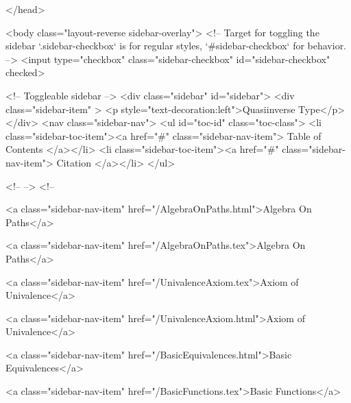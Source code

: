   
</head>




  <body class="layout-reverse sidebar-overlay">
    <!-- Target for toggling the sidebar `.sidebar-checkbox` is for regular
     styles, `#sidebar-checkbox` for behavior. -->
<input type="checkbox" class="sidebar-checkbox" id="sidebar-checkbox" checked>

<!-- Toggleable sidebar -->
<div class="sidebar" id="sidebar">
  <div class="sidebar-item" >
    <p style="text-decoration:left">Quasiinverse Type</p>
  </div>
  <nav class="sidebar-nav">
    <ul id="toc-id" class="toc-class">
  <li class="sidebar-toc-item"><a href="#" class="sidebar-nav-item"> Table of Contents </a></li>
  <li class="sidebar-toc-item"><a href="#" class="sidebar-nav-item"> Citation </a></li>
</ul>


    <!--  -->
    <!-- 
      
    
      
    
      
    
      
    
      
        
      
    
      
        
          <a class="sidebar-nav-item" href="/AlgebraOnPaths.html">Algebra On Paths</a>
        
      
    
      
        
          <a class="sidebar-nav-item" href="/AlgebraOnPaths.tex">Algebra On Paths</a>
        
      
    
      
        
          <a class="sidebar-nav-item" href="/UnivalenceAxiom.tex">Axiom of Univalence</a>
        
      
    
      
        
          <a class="sidebar-nav-item" href="/UnivalenceAxiom.html">Axiom of Univalence</a>
        
      
    
      
        
          <a class="sidebar-nav-item" href="/BasicEquivalences.html">Basic Equivalences</a>
        
      
    
      
        
          <a class="sidebar-nav-item" href="/BasicFunctions.tex">Basic Functions</a>
        
